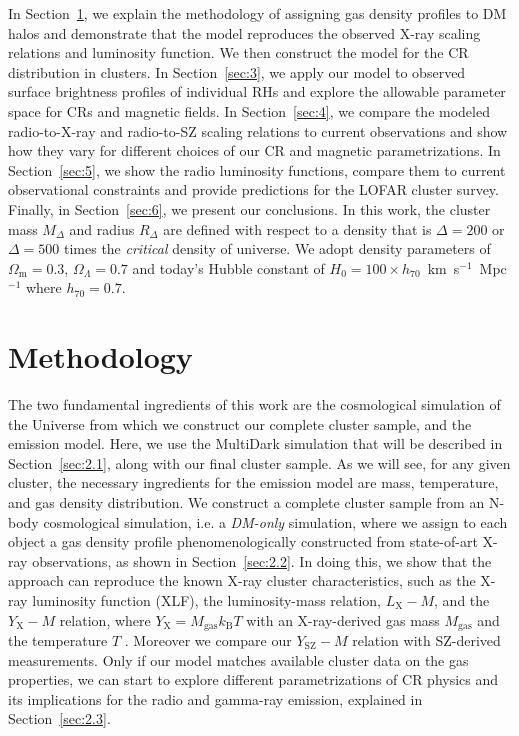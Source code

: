 \documentclass[traditabstract]{aa}
\newcommand{\rmn}{\mathrm}
\begin{document}
In Section~\ref{sec:2}, we explain the methodology of assigning gas density
profiles to DM halos and demonstrate that the model reproduces the observed
X-ray scaling relations and luminosity function. We then construct the model for
the CR distribution in clusters. In Section~\ref{sec:3}, we apply our model to
observed surface brightness profiles of individual RHs and explore the allowable
parameter space for CRs and magnetic fields. In Section~\ref{sec:4}, we compare
the modeled radio-to-X-ray and radio-to-SZ scaling relations to current
observations and show how they vary for different choices 
of our CR and magnetic parametrizations. In Section~\ref{sec:5}, we show 
the radio luminosity functions, compare them to current observational
constraints and provide predictions for the LOFAR cluster survey. Finally, in
Section~\ref{sec:6}, we present our conclusions. In this work, the cluster mass
$M_{\Delta}$ and radius $R_{\Delta}$ are defined with respect to a density that
is $\Delta=200$ or $\Delta=500$ times the \emph{critical} density of
universe. We adopt density parameters of $\Omega_{\rmn{m}}=0.3$,
$\Omega_{\Lambda}=0.7$ and today's Hubble constant of $H_0 = 100 \times
h_{70}$~km~s$^{-1}$~Mpc$^{-1}$ where $h_{70} = 0.7$.


\section{Methodology}
\label{sec:2}
The two fundamental ingredients of this work are the cosmological simulation of
the Universe from which we construct our complete cluster sample, and the
emission model. Here, we use the MultiDark simulation that will be described in
Section~\ref{sec:2.1}, along with our final cluster sample. As we will see, for
any given cluster, the necessary ingredients for the emission model are mass,
temperature, and gas density distribution. We construct a complete cluster
sample from an N-body cosmological simulation, i.e. a \emph{DM-only} simulation,
where we assign to each object a gas density profile phenomenologically
constructed from state-of-art X-ray observations, as shown in
Section~\ref{sec:2.2}. In doing this, we show that the approach can reproduce
the known X-ray cluster characteristics, such as the X-ray luminosity function
(XLF), the luminosity-mass relation, $L_{\rmn{X}}- M$, and the $Y_{\rmn{X}}-M$
relation, where $Y_{\rmn{X}}=M_\rmn{gas}k_{\rmn{B}}T$ with an X-ray-derived gas
mass $M_{\rmn{gas}}$ and the temperature $T$
\citep{2006ApJ...650..128K}. Moreover we compare our $Y_{\rmn{SZ}}-M$ relation
with SZ-derived measurements.  Only if our model matches available cluster data on
the gas properties, we can start to explore different parametrizations of CR
physics and its implications for the radio and gamma-ray emission, explained in
Section~\ref{sec:2.3}.
\end{document}
